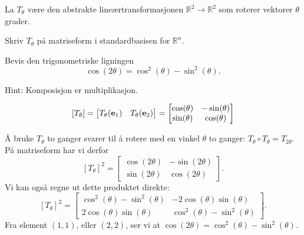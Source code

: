\begin{oppgave}
La $T_\theta$ være den abstrakte lineærtransformasjonen $\mathbb{R}^2\rightarrow \mathbb{R}^2$ som roterer vektorer $\theta$ grader.

\begin{punkt}
Skriv $T_\theta$ på matriseform i standardbasisen for $\mathbb{R}^n$.
\end{punkt}

\begin{punkt}
Bevis den trigonometriske ligningen
$$\cos(2\theta)=\cos^2(\theta)-\sin^2 (\theta).$$

\noindent
Hint: Komposisjon er multiplikasjon.
\end{punkt}


\end{oppgave}

\begin{losning}

\begin{punkt}
$$[T_\theta]=\begin{bmatrix}
T_\theta(\mathbf{e}_1) & T_\theta(\mathbf{e}_2)
\end{bmatrix} = \begin{bmatrix}
\cos(\theta) & -\sin(\theta)\\
\sin(\theta) & \cos(\theta)
\end{bmatrix}$$

\end{punkt}

\begin{punkt}
Å bruke $T_\theta$ to ganger svarer til å rotere med en vinkel $\theta$ to ganger: $T_\theta \circ T_\theta=T_{2\theta}$.
På matriseform har vi derfor $$[T_\theta]^2= \begin{bmatrix}
\cos(2\theta) & -\sin(2\theta)\\
\sin(2\theta) & \cos(2\theta)
\end{bmatrix}.$$ Vi kan også regne ut dette produktet direkte:
$$[T_\theta]^2=\begin{bmatrix}
\cos^2(\theta)-\sin^2(\theta) & -2\cos(\theta)\sin(\theta)\\
2\cos(\theta)\sin(\theta) & \cos^2(\theta)-\sin^2(\theta)
\end{bmatrix}.$$ Fra element $(1,1)$, eller $(2,2)$, ser vi at $\cos(2\theta)=\cos^2(\theta)-\sin^2(\theta)$.

\end{punkt}

\end{losning}


